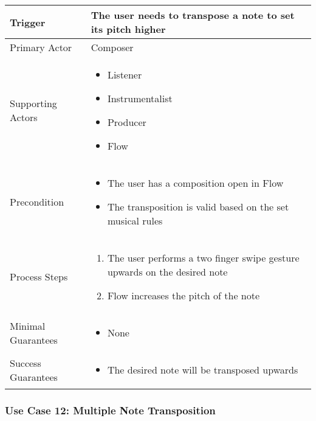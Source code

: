 \begin{tabularx}{\textwidth}{|X|X|}
\hline
Trigger & 
The user needs to transpose a note to set its pitch higher \\
\hline
Primary Actor & 
Composer \\
\hline
Supporting Actors & 
\begin{itemize}
\item Listener
\item Instrumentalist
\item Producer
\item Flow
\end{itemize} \\
\hline
Precondition & 
\begin{itemize}
\item The user has a composition open in Flow
\item The transposition is valid based on the set musical rules
\end{itemize} \\
\hline
Process Steps & 
\begin{enumerate}
\item The user performs a two finger swipe gesture upwards on the desired note
\item Flow increases the pitch of the note
\end{enumerate} \\
\hline
Minimal Guarantees & 
\begin{itemize}
  \item None
\end{itemize} \\
\hline
Success Guarantees & 
\begin{itemize}
  \item The desired note will be transposed upwards
\end{itemize} \\
\hline
\end{tabularx}

\subsubsection{Use Case 12: Multiple Note Transposition}

